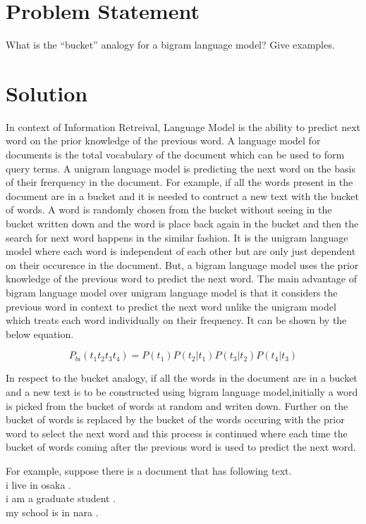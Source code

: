 \documentclass[12pt]{report}
\begin{document}
\section{Problem Statement}
What is the “bucket” analogy for a bigram language model? Give examples.   
\section{Solution}
In context of Information Retreival, Language Model is the ability to predict next word on the prior knowledge of the previous word. A language model for documents is the total vocabulary of the document which can be used to form query terms. A unigram language model is predicting the next word on the basis of their frerquency in the document. For example, if all the words present in the document are in a bucket and it is needed to contruct a new text with the bucket of words. A word is randomly chosen from the bucket without seeing in the bucket written down and the word is place back again in the bucket and then the search for next word happens in the similar fashion. It is the unigram language model where each word is independent of each other but are only just dependent on their occurence in the document. But, a bigram language model uses the prior knowledge of the previous word to predict the next word. The main advantage of bigram language model over unigram language model is that it considers the previous word in context to predict the next word unlike the unigram model which treats each word individually on their frequency. It can be shown by the below equation.

\[P_{bi}(t_1t_2t_3t_4) = P(t_1)P(t_2\vert t_1)P(t_3\vert t_2)P(t_4\vert t_3)\]

In respect to the bucket analogy, if all the words in the document are in a bucket and a new text is to be constructed using bigram language model,initially a word is picked from the bucket of words at random and writen down. Further on the bucket of words is replaced by the bucket of the words occuring with the prior word to select the next word and this process is continued where each time the bucket of words coming after the previous word is used to predict the next word.

For example, suppose there is a document that has following text.\\
i live in osaka .\\
i am a graduate student .\\
my school is in nara .\\
\end{document}
